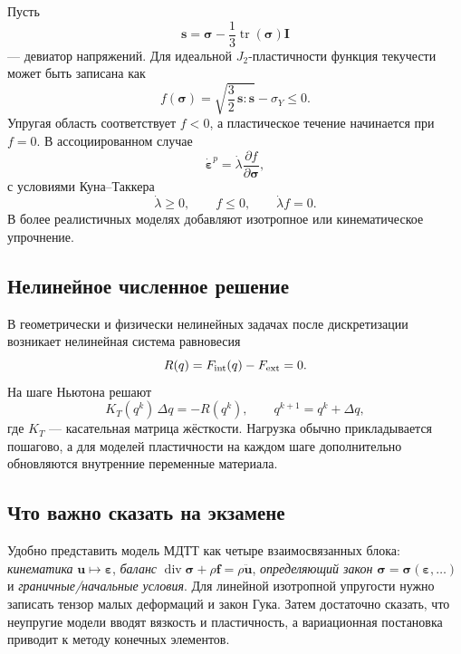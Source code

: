 Пусть
\[
    \mathbf s=\boldsymbol\sigma
    -\frac13\operatorname{tr}(\boldsymbol\sigma)\mathbf I
\]
--- девиатор напряжений. Для идеальной $J_2$-пластичности функция текучести
может быть записана как
\[
    f(\boldsymbol\sigma)
    =\sqrt{\frac32\,\mathbf s:\mathbf s}-\sigma_Y\le0.
\]
Упругая область соответствует $f<0$, а пластическое течение начинается при
$f=0$. В ассоциированном случае
\[
    \dot{\boldsymbol\varepsilon}^{p}
    =\dot\lambda\frac{\partial f}{\partial\boldsymbol\sigma},
\]
с условиями Куна--Таккера
\[
    \dot\lambda\ge0,
    \qquad f\le0,
    \qquad \dot\lambda f=0.
\]
В более реалистичных моделях добавляют изотропное или кинематическое упрочнение.

\subsection{Нелинейное численное решение}

В геометрически и физически нелинейных задачах после дискретизации возникает
нелинейная система равновесия
\[
    R(q)=F_{\rm int}(q)-F_{\rm ext}=0.
\]
На шаге Ньютона решают
\[
    K_T(q^k)\,\Delta q=-R(q^k),
    \qquad q^{k+1}=q^k+\Delta q,
\]
где $K_T$ --- касательная матрица жёсткости. Нагрузка обычно прикладывается
пошагово, а для моделей пластичности на каждом шаге дополнительно обновляются
внутренние переменные материала.

\subsection{Что важно сказать на экзамене}

Удобно представить модель МДТТ как четыре взаимосвязанных блока:
\emph{кинематика} $\mathbf u\mapsto\boldsymbol\varepsilon$,
\emph{баланс} $\operatorname{div}\boldsymbol\sigma+\rho\mathbf f
=\rho\ddot{\mathbf u}$, \emph{определяющий закон}
$\boldsymbol\sigma=\boldsymbol\sigma(\boldsymbol\varepsilon,\ldots)$ и
\emph{граничные/начальные условия}. Для линейной изотропной упругости нужно
записать тензор малых деформаций и закон Гука. Затем достаточно сказать, что
неупругие модели вводят вязкость и пластичность, а вариационная постановка
приводит к методу конечных элементов.

\newpage
